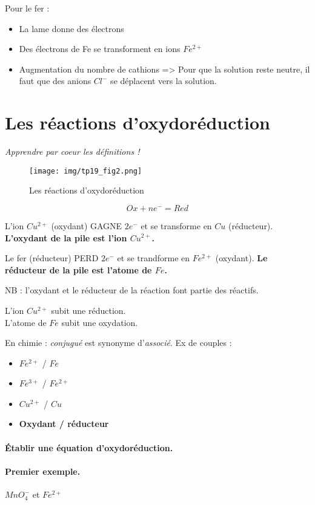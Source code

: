 \documentclass[12pt]{article}
\begin{document}
Pour le fer :
\begin{itemize}
\item La lame donne des électrons
\item Des électrons de Fe se transforment en ions $Fe^{2+}$
\item Augmentation du nombre de cathions
=> Pour que la solution reste neutre, il faut que des anions $Cl^-$ se déplacent vers la solution.
\end{itemize}

\section{Les réactions d'oxydoréduction}

\textit{Apprendre par coeur les définitions !}

\begin{figure}[htp]
\centering
\texttt{[image: img/tp19\_fig2.png]}
\caption{Les réactions d'oxydoréduction}
\label{}
\end{figure}

\[Ox + ne^- = Red\]

L'ion $Cu^{2+}$ (oxydant) GAGNE $2e^-$ et se transforme en $Cu$ (réducteur).
\textbf{L'oxydant de la pile est l'ion $Cu^{2+}$.}

Le fer (réducteur) PERD $2e^-$ et se trandforme en $Fe^{2+}$ (oxydant).
\textbf{Le réducteur de la pile est l'atome de $Fe$.}

NB : l'oxydant et le réducteur de la réaction font partie des réactifs.

L'ion $Cu^{2+}$ subit une réduction.\\
L'atome de $Fe$ subit une oxydation.

En chimie : \textit{conjugué} est synonyme d'\textit{associé}. Ex de couples :
\begin{itemize}
\item $Fe^{2+}$ / $Fe$
\item $Fe^{3+}$ / $Fe^{2+}$
\item $Cu^{2+}$ / $Cu$
\item \textbf{Oxydant / réducteur}
\end{itemize}

\paragraph{Établir une équation d'oxydoréduction.}

\paragraph{Premier exemple.}
$MnO_4^-$ et $Fe^{2+}$
\end{document}
